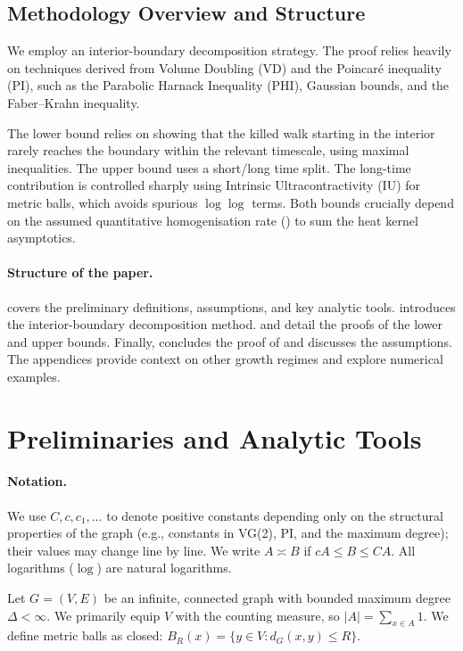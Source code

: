 \documentclass{article}
\numberwithin{equation}{section}
\theoremstyle{definition}
\theoremstyle{remark}
\begin{document}
\subsection{Methodology Overview and Structure}
We employ an interior-boundary decomposition strategy. The proof relies heavily on techniques derived from Volume Doubling (VD) and the Poincaré inequality (PI), such as the Parabolic Harnack Inequality (PHI), Gaussian bounds, and the Faber–Krahn inequality.

The lower bound relies on showing that the killed walk starting in the interior rarely reaches the boundary within the relevant timescale, using maximal inequalities. The upper bound uses a short/long time split. The long-time contribution is controlled sharply using Intrinsic Ultracontractivity (IU) for metric balls, which avoids spurious $\log\log$ terms. Both bounds crucially depend on the assumed quantitative homogenisation rate () to sum the heat kernel asymptotics.

\paragraph{Structure of the paper.} 
 covers the preliminary definitions, assumptions, and key analytic tools.  introduces the interior-boundary decomposition method.  and  detail the proofs of the lower and upper bounds. Finally,  concludes the proof of  and discusses the assumptions. The appendices provide context on other growth regimes and explore numerical examples.


\section{Preliminaries and Analytic Tools}\label{sec:prelim}

\paragraph{Notation.} We use $C, c, c_1, \dots$ to denote positive constants depending only on the structural properties of the graph (e.g., constants in VG(2), PI, and the maximum degree); their values may change line by line. We write $A \asymp B$ if $c A \leq B \leq C A$. All logarithms ($\log$) are natural logarithms.

Let $G = (V,E)$ be an infinite, connected graph with bounded maximum degree $\Delta < \infty$. We primarily equip $V$ with the counting measure, so $|A| = \sum_{x \in A} 1$. We define metric balls as closed: $B_R(x) = \{y \in V : d_G(x,y) \leq R\}$.
\end{document}
